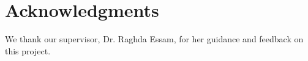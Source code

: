 \chapter*{Acknowledgments}
We thank our supervisor, Dr. Raghda Essam, for her guidance and feedback on this project.
